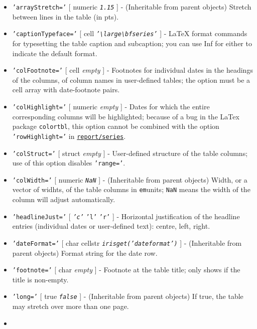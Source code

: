 \begin{itemize}
\item
  \texttt{'arrayStretch='} {[} numeric \textbar{} \emph{\texttt{1.15}}
  {]} - (Inheritable from parent objects) Stretch between lines in the
  table (in pts).
\item
  \texttt{'captionTypeface='} {[} cell \textbar{}
  \emph{\texttt{'\textbackslash{}large\textbackslash{}bfseries'}} {]} -
  LaTeX format commands for typesetting the table caption and
  subcaption; you can use Inf for either to indicate the default format.
\item
  \texttt{'colFootnote='} {[} cell \textbar{} \emph{empty} {]} -
  Footnotes for individual dates in the headings of the columns, of
  column names in user-defined tables; the option must be a cell array
  with date-footnote pairs.
\item
  \texttt{'colHighlight='} {[} numeric \textbar{} \emph{empty} {]} -
  Dates for which the entire corresponding columns will be highlighted;
  because of a bug in the LaTex package \texttt{colortbl}, this option
  cannot be combined with the option \texttt{'rowHighlight='} in
  \href{report/series}{\texttt{report/series}}.
\item
  \texttt{'colStruct='} {[} struct \textbar{} \emph{empty} {]} -
  User-defined structure of the table columns; use of this option
  disables \texttt{'range='}.
\item
  \texttt{'colWidth='} {[} numeric \textbar{} \emph{\texttt{NaN}} {]} -
  (Inheritable from parent objects) Width, or a vector of widhts, of the
  table columns in \texttt{em}units; \texttt{NaN} means the width of the
  column will adjust automatically.
\item
  \texttt{'headlineJust='} {[} \emph{\texttt{'c'}} \textbar{}
  \texttt{'l'} \textbar{} \texttt{'r'} {]} - Horizontal justification of
  the headline entries (individual dates or user-defined text): centre,
  left, right.
\item
  \texttt{'dateFormat='} {[} char \textbar{} cellstr \textbar{}
  \emph{\texttt{irisget('dateformat')}} {]} - (Inheritable from parent
  objects) Format string for the date row.
\item
  \texttt{'footnote='} {[} char \textbar{} \emph{empty} {]} - Footnote
  at the table title; only shows if the title is non-empty.
\item
  \texttt{'long='} {[} true \textbar{} \emph{\texttt{false}} {]} -
  (Inheritable from parent objects) If true, the table may stretch over
  more than one page.
\item

\end{itemize}
